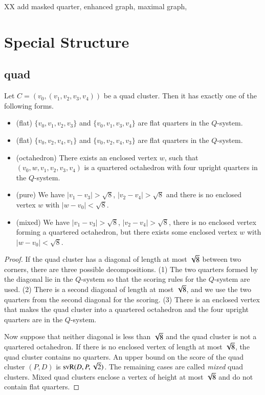 XX add masked quarter, enhanced graph, maximal graph,


\section{Special Structure}

\subsection{quad}
\label{sec:quad-class}


\begin{lemma}
Let $C=(v_0,(v_1,v_2,v_3,v_4))$ be a quad cluster.  Then it has
exactly one of the following forms.
\begin{itemize}
  \item (flat) $\{v_0,v_1,v_2,v_3\}$ and $\{v_0,v_1,v_3,v_4\}$ are flat
    quarters in the $Q$-system.
   \item (flat) $\{v_0,v_2,v_4,v_1\}$ and $\{v_0,v_2,v_4,v_3\}$ are flat
     quarters in the $Q$-system.
     \item (octahedron) There exists an enclosed vertex $w$, such that
       $(v_0,w,v_1,v_2,v_3,v_4)$ is a quartered octahedron with
       four upright quarters in the $Q$-system.
   \item (pure) We have $|v_1-v_3|>\sqrt8$, $|v_2-v_4|>\sqrt8$ and
     there is no enclosed vertex $w$ with $|w-v_0|<\sqrt8$.
    \item (mixed) We have $|v_1-v_3|>\sqrt8$, $|v_2-v_4|>\sqrt8$, there
      is no enclosed vertex forming a quartered octahedron, but
      there exists some enclosed vertex $w$ with $|w-v_0|<\sqrt8$.
\end{itemize}
\end{lemma}

\begin{proof}
If the quad cluster has a diagonal of length at most $\sqrt8$
between two corners, there are three possible decompositions. (1)
The two quarters formed by the diagonal lie in the $Q$-system so
that the scoring rules for the $Q$-system are used.  (2) There is
a second diagonal of length at most $\sqrt8$, and we use the two
quarters from the second diagonal for the scoring. (3) There is an
enclosed vertex that makes the quad cluster into a quartered
octahedron and the four upright quarters are in the $Q$-system.

Now suppose that neither diagonal is less than $\sqrt8$ and the
quad cluster is not a quartered octahedron. If there is no
enclosed vertex of length at most $\sqrt8$, the quad cluster
contains no quarters. An upper bound on the score of the quad
cluster $(P,D)$ is ${\operatorname{svR}}(D,P,\sqrt2)$. The remaining cases are
called {\it mixed\/} quad clusters. Mixed quad clusters enclose a
vertex of height at most $\sqrt8$ and do not contain flat quarters.
\end{proof}





